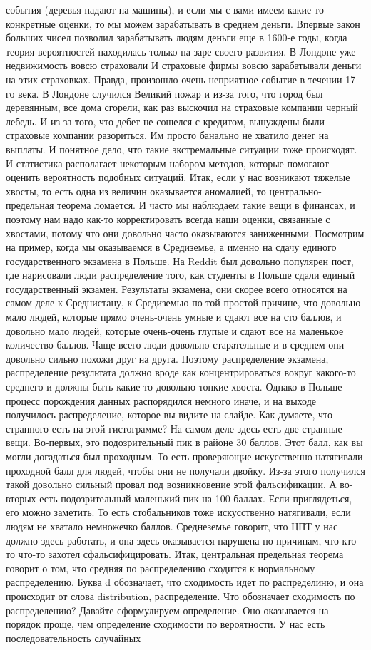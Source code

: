 \documentclass[12pt, a4paper, oneside]{article}
\begin{document}
события (деревья падают на машины), и если мы с вами имеем какие-то конкретные оценки, то мы можем зарабатывать в среднем деньги. Впервые закон больших чисел позволил зарабатывать людям деньги еще в 1600-е годы, когда теория вероятностей находилась только на заре своего развития. В Лондоне уже недвижимость вовсю страховали И страховые фирмы вовсю зарабатывали деньги на этих страховках. Правда, произошло очень неприятное событие в течении 17-го века. В Лондоне случился Великий пожар и из-за того, что город был деревянным, все дома сгорели, как раз выскочил на страховые компании черный лебедь. И из-за того, что дебет не сошелся с кредитом, вынуждены были страховые компании разориться. Им просто банально не хватило денег на выплаты. И понятное дело, что такие экстремальные ситуации тоже происходят. И статистика располагает некоторым набором методов, которые помогают оценить вероятность подобных ситуаций. Итак, если у нас возникают тяжелые хвосты, то есть одна из величин оказывается аномалией, то центрально-предельная теорема ломается. И часто мы наблюдаем такие вещи в финансах, и поэтому нам надо как-то корректировать всегда наши оценки, связанные с хвостами, потому что они довольно часто оказываются заниженными. Посмотрим на пример, когда мы оказываемся в Средиземье, а именно на сдачу единого государственного экзамена в Польше. На Reddit был довольно популярен пост, где нарисовали люди распределение того, как студенты в Польше сдали единый государственный экзамен. Результаты экзамена, они скорее всего относятся на самом деле к Среднистану, к Средиземью по той простой причине, что довольно мало людей, которые прямо очень-очень умные и сдают все на сто баллов, и довольно мало людей, которые очень-очень глупые и сдают все на маленькое количество баллов. Чаще всего люди довольно старательные и в среднем они довольно сильно похожи друг на друга. Поэтому распределение экзамена, распределение результата должно вроде как концентрироваться вокруг какого-то среднего и должны быть какие-то довольно тонкие хвоста. Однако в Польше процесс порождения данных распорядился немного иначе, и на выходе получилось распределение, которое вы видите на слайде. Как думаете, что странного есть на этой гистограмме? На самом деле здесь есть две странные вещи. Во-первых, это подозрительный пик в районе 30 баллов. Этот балл, как вы могли догадаться был проходным. То есть проверяющие искусственно натягивали проходной балл для людей, чтобы они не получали двойку. Из-за этого получился такой довольно сильный провал под возникновение этой фальсификации. А во-вторых есть подозрительный маленький пик на 100 баллах. Если приглядеться, его можно заметить. То есть стобальников тоже искусственно натягивали, если людям не хватало немножечко баллов. Среднеземье говорит, что ЦПТ у нас должно здесь работать, и она здесь оказывается нарушена по причинам, что кто-то что-то захотел сфальсифицировать. Итак, центральная предельная теорема говорит о том, что средняя по распределению сходится к нормальному распределению. Буква d обозначает, что сходимость идет по распределиню, и она происходит от слова distribution, распределение. Что обозначает сходимость по распределению? Давайте сформулируем определение. Оно оказывается на порядок проще, чем определение сходимости по вероятности. У нас есть последовательность случайных 
\end{document}
